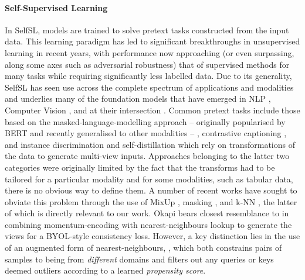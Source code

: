 \paragraph{Self-Supervised Learning} 
%
In \ac{SelfSL}, models are trained to solve pretext tasks constructed from the input data.
%
This learning paradigm has led to significant breakthroughs in unsupervised learning in recent
years, with performance now approaching (or even surpassing, along some axes such as adversarial
robustness) that of supervised methods for many tasks while requiring significantly less labelled data.
%
Due to its generality, \ac{SelfSL} has seen use across the complete spectrum of applications and
modalities and underlies many of the foundation models \citep{bommasani2021opportunities} that have
emerged in NLP \citep{brown2020language, chowdhery2022palm, devlin2018bert}, Computer Vision
\citep{goyal2022vision}, and at their intersection \citep{alayrac2022flamingo, yu2022coca}.
%
Common pretext tasks include those based on the masked-language-modelling approach -- originally
popularised by BERT \citep{devlin2018bert} and recently generalised to other modalities
\citep{baevski2022data2vec, bao2021beit} -- \citep{chen2020simple, he2020momentum}, contrastive
captioning  \citep{radford2021learning, yu2022coca}, and instance discrimination and
self-distillation \citep{caron2021emerging, grill2020bootstrap} which rely on transformations of
the data to generate multi-view inputs.
%
Approaches belonging to the latter two categories were originally limited by the fact that the
transforms had to be tailored for a particular modality and for some modalities, such as tabular
data, there is no obvious way to define them.
%
A number of recent works have sought to obviate this problem through the use of  MixUp
\citep{verma2021towards}, masking \citep{baevski2022data2vec, MaskedAutoencoders2021}, and k-NN
\citep{dwibedi2021little, koohpayegani2021mean, van2021revisiting}, the latter of which is directly
relevant to our work.
%
Okapi bears closest resemblance to \cite{koohpayegani2021mean} in combining momentum-encoding with
nearest-neighbours lookup to generate the views for a BYOL-style \citep{grill2020bootstrap}
consistency loss. 
%
However, a key distinction lies in the use of an augmented form of nearest-neighbours, \CNN, which
both constrains pairs of samples to being from \emph{different} domains and filters out any queries
or keys deemed outliers according to a learned \emph{propensity score}. 

